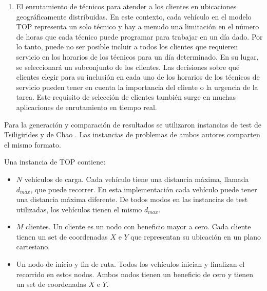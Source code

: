 \begin{enumerate}[i]
\item

El enrutamiento de técnicos para atender a los clientes en ubicaciones geográficamente distribuidas. En este contexto, cada vehículo en el modelo TOP representa un solo técnico y hay a menudo una limitación en el número de horas que cada técnico puede programar para trabajar en un día dado. Por lo tanto, puede no ser posible incluir a todos los clientes que requieren servicio en los horarios de los técnicos para un día determinado. En su lugar, se seleccionará un subconjunto de los clientes. Las decisiones sobre qué clientes elegir para su inclusión en cada uno de los horarios de los técnicos de servicio pueden tener en cuenta la importancia del cliente o la urgencia de la tarea. Este requisito de selección de clientes también surge en muchas aplicaciones de enrutamiento en tiempo real.

\end{enumerate}

Para la generación y comparación de resultados se utilizaron instancias de test de Tsiligirides y de Chao \cite{IntancesChaoTsiligirides}. Las instancias de problemas de ambos autores comparten el mismo formato. 

\bigskip

\begin{minipage}{\textwidth}
Una instancia de TOP contiene:

\begin{itemize}
  \item $N$ vehículos de carga. Cada vehículo tiene una distancia máxima, llamada $d_{max}$, que puede recorrer. En esta implementación cada vehículo puede tener una distancia máxima diferente. De todos modos en las instancias de test utilizadas, los vehículos tienen el mismo $d_{max}$.
  \item $M$ clientes. Un cliente es un nodo con beneficio mayor a cero. Cada cliente tienen un set de coordenadas $X$ e $Y$ que representan su ubicación en un plano cartesiano.
  \item Un nodo de inicio y fin de ruta. Todos los vehículos inician y finalizan el recorrido en estos nodos. Ambos nodos tienen un beneficio de cero y tienen un set de coordenadas $X$ e $Y$.
\end{itemize}
\end{minipage}

\bigskip

